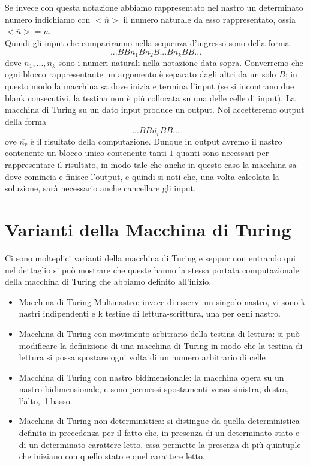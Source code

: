 Se invece con questa notazione abbiamo rappresentato nel nastro un
determinato numero indichiamo con $<\overline{n}>$ il numero naturale
da esso rappresentato, ossia $<\overline{n}>=n$.\\ Quindi gli input
che compariranno nella sequenza d'ingresso sono della forma
$$...BB\overline{n_{1}}B\overline{n_{2}}B...B\overline{n_{k}}BB...$$
dove $\overline{n_1},...,\overline{n_k}$ sono i numeri naturali nella
notazione data sopra. Converremo che ogni blocco rappresentante un
argomento \`e separato dagli altri da un solo $B$; in questo modo la
macchina sa dove inizia e termina l'input (se si incontrano due blank
consecutivi, la testina non \`e pi\`u collocata su una delle celle di
input). La macchina di Turing su un dato input produce un output. Noi
accetteremo output della forma $$...BB\overline{n_r}BB...$$ ove
$\overline{n_r}$ \`e il risultato della computazione. Dunque in output
avremo il nastro contenente un blocco unico contenente tanti $1$
quanti sono necessari per rappresentare il risultato, in modo tale che
anche in questo caso la macchina sa dove comincia e finisce l'output,
e quindi si noti che, una volta calcolata la soluzione, sar\`a
necessario anche cancellare gli input.

\section{Varianti della Macchina di Turing}
Ci sono molteplici varianti della macchina di Turing e seppur non
entrando qui nel dettaglio si pu\`o mostrare che queste hanno la
stessa portata computazionale della macchina di Turing che abbiamo
definito all'inizio.
\begin{itemize}
\item Macchina di Turing Multinastro: invece di esservi un singolo
  nastro, vi sono k nastri indipendenti e k testine di
  lettura-scrittura, una per ogni nastro.
\item Macchina di Turing con movimento arbitrario della testina di
  lettura: si pu\`o modificare la definizione di una macchina di
  Turing in modo che la testina di lettura si possa spostare ogni
  volta di un numero arbitrario di celle
\item Macchina di Turing con nastro bidimensionale: la macchina opera
  su un nastro bidimensionale, e sono permessi spostamenti verso
  sinistra, destra, l'alto, il basso.
\item Macchina di Turing non deterministica: si distingue da quella
  deterministica definita in precedenza per il fatto che, in presenza
  di un determinato stato e di un determinato carattere letto, essa
  permette la presenza di pi\`u quintuple che iniziano con quello
  stato e quel carattere letto.
\end{itemize}


